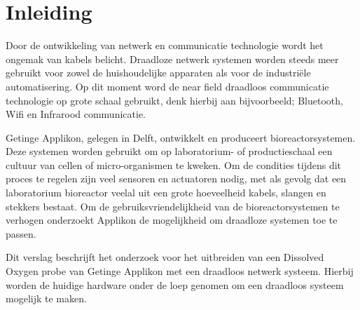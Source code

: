 \section*{Inleiding}
Door de ontwikkeling van netwerk en communicatie technologie wordt het ongemak van kabels belicht. Draadloze netwerk systemen worden steeds meer gebruikt voor zowel de huishoudelijke apparaten als voor de industri{\"e}le automatisering. Op dit moment word de near field draadloos communicatie technologie op grote schaal gebruikt, denk hierbij aan bijvoorbeeld; Bluetooth, Wifi en Infrarood communicatie. 

Getinge Applikon, gelegen in Delft, ontwikkelt en produceert bioreactorsystemen. Deze systemen worden gebruikt om op laboratorium- of productieschaal een cultuur van cellen of micro-organismen te kweken. Om de condities tijdens dit proces te regelen zijn veel sensoren en actuatoren nodig, met als gevolg dat een laboratorium bioreactor veelal uit een grote hoeveelheid kabels, slangen en stekkers bestaat. Om de gebruiksvriendelijkheid van de bioreactorsystemen te verhogen onderzoekt Applikon de mogelijkheid om draadloze systemen toe te passen.

Dit verslag beschrijft het onderzoek voor het uitbreiden van een Dissolved Oxygen probe van Getinge Applikon met een draadloos netwerk systeem. Hierbij worden de huidige hardware onder de loep genomen om een draadloos systeem mogelijk te maken. 